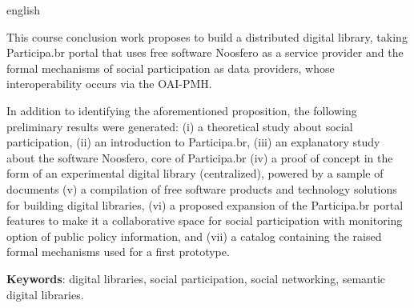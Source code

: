 \begin{resumo}[Abstract]
  \begin{otherlanguage*}{english} 
  
  
This course conclusion work proposes to build a distributed digital library, taking Participa.br portal that uses free software Noosfero as a service provider and the formal mechanisms of social participation as data providers, whose interoperability occurs via the OAI-PMH.

In addition to identifying the aforementioned proposition, the following preliminary results were generated: (i) a theoretical study about social participation, (ii) an introduction to Participa.br, (iii) an explanatory study about the software Noosfero, core of Participa.br (iv) a proof of concept in the form of an experimental digital library (centralized), powered by a sample of documents (v) a compilation of free software products and technology solutions for building digital libraries, (vi) a proposed expansion of the Participa.br portal features to make it a collaborative space for social participation with monitoring option of public policy information, and (vii) a catalog containing the raised formal mechanisms used for a first prototype.

  
  \vspace{\onelineskip}
 
  \noindent 
  \textbf{Keywords}: digital libraries, social participation, social networking, semantic digital libraries.
  \end{otherlanguage*}
\end{resumo}


